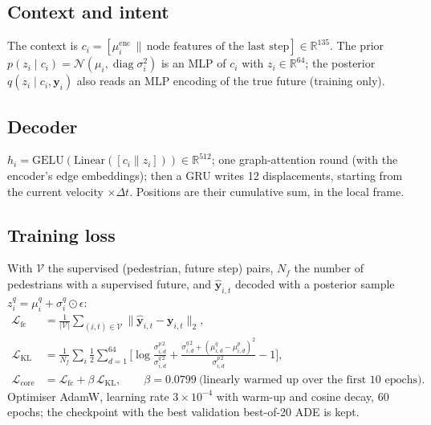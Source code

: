 \documentclass[10pt]{article}
\begin{document}
\subsection{Context and intent}
The context is $c_i=[\mu^{\text{enc}}_i \,\|\, \text{node features of the last step}]\in\mathbb R^{135}$. The prior
$p(z_i\mid c_i)=\mathcal N(\mu_i,\operatorname{diag}\sigma_i^2)$ is an MLP of $c_i$ with $z_i\in\mathbb R^{64}$; the posterior
$q(z_i\mid c_i,\mathbf y_i)$ also reads an MLP encoding of the true future (training only).



\subsection{Decoder}
$h_i=\mathrm{GELU}(\mathrm{Linear}([c_i\|z_i]))\in\mathbb R^{512}$; one graph-attention round (with the encoder's
edge embeddings); then a GRU writes 12 displacements, starting from the current velocity $\times\Delta t$. Positions
are their cumulative sum, in the local frame.



\subsection{Training loss}
With $\mathcal V$ the supervised (pedestrian, future step) pairs, $N_f$ the number of pedestrians with a
supervised future, and $\hat{\mathbf y}_{i,t}$ decoded with a posterior sample $z^q_i=\mu^q_i+\sigma^q_i\odot\epsilon$:
\begin{align*}
\mathcal L_{\text{fc}} &= \frac{1}{|\mathcal V|}\sum_{(i,t)\in\mathcal V}\big\|\hat{\mathbf y}_{i,t}-\mathbf y_{i,t}\big\|_2,\\
\mathcal L_{\text{KL}} &= \frac{1}{N_f}\sum_i \tfrac12\sum_{d=1}^{64}\Big[\log\tfrac{\sigma^{p\,2}_{i,d}}{\sigma^{q\,2}_{i,d}}+\tfrac{\sigma^{q\,2}_{i,d}+(\mu^q_{i,d}-\mu^p_{i,d})^2}{\sigma^{p\,2}_{i,d}}-1\Big],\\
\mathcal L_{\text{core}} &= \mathcal L_{\text{fc}}+\beta\,\mathcal L_{\text{KL}},\qquad \beta=0.0799\ \text{(linearly warmed up over the first 10 epochs)}.
\end{align*}
Optimiser AdamW, learning rate $3\times10^{-4}$ with warm-up and cosine decay, 60 epochs; the checkpoint with the
best validation best-of-20 ADE is kept.
\end{document}
